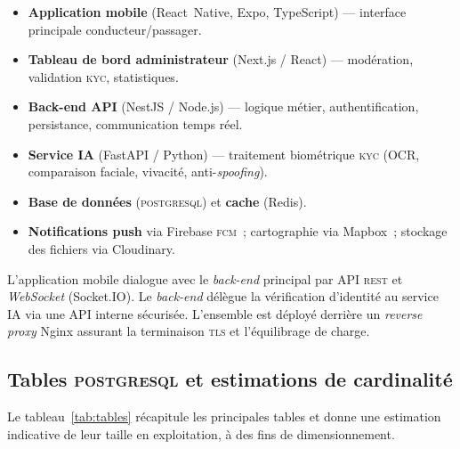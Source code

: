\documentclass[12pt, a4paper, oneside]{report}
\begin{document}
\begin{itemize}
  \item \textbf{Application mobile} (React~Native, Expo, TypeScript) --- interface principale conducteur/passager.
  \item \textbf{Tableau de bord administrateur} (Next.js / React) --- modération, validation \textsc{kyc}, statistiques.
  \item \textbf{Back-end API} (NestJS / Node.js) --- logique métier, authentification, persistance, communication temps réel.
  \item \textbf{Service IA} (FastAPI / Python) --- traitement biométrique \textsc{kyc} (OCR, comparaison faciale, vivacité, anti-\textit{spoofing}).
  \item \textbf{Base de données} (\textsc{postgresql}) et \textbf{cache} (Redis).
  \item \textbf{Notifications push} via Firebase \textsc{fcm}~; cartographie via Mapbox~; stockage des fichiers via Cloudinary.
\end{itemize}

L'application mobile dialogue avec le \textit{back-end} principal par API \textsc{rest} et \textit{WebSocket} (Socket.IO). Le \textit{back-end} délègue la vérification d'identité au service IA via une API interne sécurisée. L'ensemble est déployé derrière un \textit{reverse proxy} Nginx assurant la terminaison \textsc{tls} et l'équilibrage de charge.

\subsection{Tables \textsc{postgresql} et estimations de cardinalité}

Le tableau~\ref{tab:tables} récapitule les principales tables et donne une estimation indicative de leur taille en exploitation, à des fins de dimensionnement.
\end{document}

